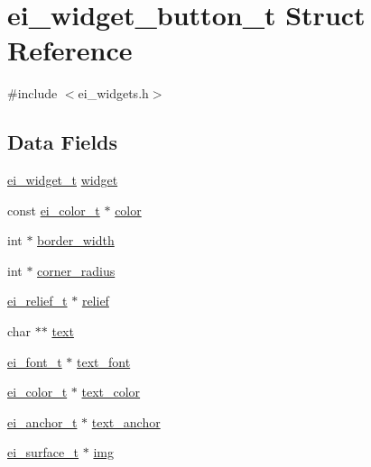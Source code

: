 \hypertarget{structei__widget__button__t}{\section{ei\-\_\-widget\-\_\-button\-\_\-t Struct Reference}
\label{structei__widget__button__t}
}


{\ttfamily \#include $<$ei\-\_\-widgets.\-h$>$}

\subsection*{Data Fields}
\begin{DoxyCompactItemize}
\item 
\hyperlink{structei__widget__t}{ei\-\_\-widget\-\_\-t} \hyperlink{structei__widget__button__t_acf769e84e4a3cd0201c019998850deef}{widget}
\item 
const \hyperlink{structei__color__t}{ei\-\_\-color\-\_\-t} $\ast$ \hyperlink{structei__widget__button__t_aef37181d119084c4689f3925378f4be8}{color}
\item 
int $\ast$ \hyperlink{structei__widget__button__t_a8aa5dab16784f5eb60027d58be6789d1}{border\-\_\-width}
\item 
int $\ast$ \hyperlink{structei__widget__button__t_ae15fd0035fd44f9a3341e15708b4649e}{corner\-\_\-radius}
\item 
\hyperlink{ei__types_8h_aa79a32b1d8ece0e44cfa394e870b270b}{ei\-\_\-relief\-\_\-t} $\ast$ \hyperlink{structei__widget__button__t_a2e9dea6f5b930ee161a30adb1c19f28c}{relief}
\item 
char $\ast$$\ast$ \hyperlink{structei__widget__button__t_a88bc50591c237866ef1a195ad72a1585}{text}
\item 
\hyperlink{ei__types_8h_a22c8198e4d641e4bc67bb17f9c6bcda7}{ei\-\_\-font\-\_\-t} $\ast$ \hyperlink{structei__widget__button__t_a2617635a42c83b0b60bbf911f3d0c0f3}{text\-\_\-font}
\item 
\hyperlink{structei__color__t}{ei\-\_\-color\-\_\-t} $\ast$ \hyperlink{structei__widget__button__t_ae53bef4e2ecd6f4337812125aa5b63a4}{text\-\_\-color}
\item 
\hyperlink{ei__types_8h_a3852c963af609d31d7cfcff79c4c8450}{ei\-\_\-anchor\-\_\-t} $\ast$ \hyperlink{structei__widget__button__t_a376dc78fad11797c2dbdaa032953e8a5}{text\-\_\-anchor}
\item 
\hyperlink{hw__interface_8h_ad9970ae727c438faaf09c58c5defb796}{ei\-\_\-surface\-\_\-t} $\ast$ \hyperlink{structei__widget__button__t_a0f160c882c948d59242d7db945ec51c2}{img}
$$
\end{DoxyCompactItemize}
